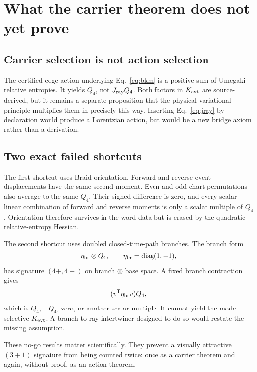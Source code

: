 \documentclass[11pt]{article}
\theoremstyle{definition}
\theoremstyle{remark}
\begin{document}
\section{What the carrier theorem does not yet prove}

\subsection{Carrier selection is not action selection}

The certified edge action underlying Eq.~\eqref{eq:bkm} is a positive sum of Umegaki relative entropies. It yields $Q_4$, not $J_{\rm ray}Q_4$. Both factors in $K_{\rm evt}$ are source-derived, but it remains a separate proposition that the physical variational principle multiplies them in precisely this way. Inserting Eq.~\eqref{eq:jray} by declaration would produce a Lorentzian action, but would be a new bridge axiom rather than a derivation.

\subsection{Two exact failed shortcuts}

The first shortcut uses Braid orientation. Forward and reverse event displacements have the same second moment. Even and odd chart permutations also average to the same $Q_4$. Their signed difference is zero, and every scalar linear combination of forward and reverse moments is only a scalar multiple of $Q_4$. Orientation therefore survives in the word data but is erased by the quadratic relative-entropy Hessian.

The second shortcut uses doubled closed-time-path branches. The branch form
\begin{equation}
 \eta_{\rm br}\otimes Q_4,
 \qquad \eta_{\rm br}=\operatorname{diag}(1,-1),
\end{equation}
has signature $(4+,4-)$ on branch $\otimes$ base space. A fixed branch contraction gives
\begin{equation}
 (v^{\mathsf T}\eta_{\rm br}v)Q_4,
\end{equation}
which is $Q_4$, $-Q_4$, zero, or another scalar multiple. It cannot yield the mode-selective $K_{\rm evt}$. A branch-to-ray intertwiner designed to do so would restate the missing assumption.

These no-go results matter scientifically. They prevent a visually attractive $(3+1)$ signature from being counted twice: once as a carrier theorem and again, without proof, as an action theorem.
\end{document}

